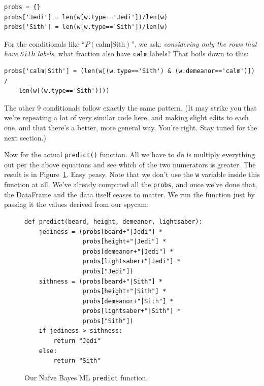 \begin{Verbatim}[fontsize=\small,samepage=true,frame=single]
probs = {}
probs['Jedi'] = len(w[w.type=='Jedi'])/len(w)
probs['Sith'] = len(w[w.type=='Sith'])/len(w)
\end{Verbatim}

For the conditionals like ``$P(\textrm{calm}|\textrm{Sith})$'', we ask:
\textit{considering only the rows that have \texttt{Sith} labels}, what
fraction also have \texttt{calm} labels? That boils down to this:

\footnotesize
\begin{Verbatim}[fontsize=\small,samepage=true,frame=single]
probs['calm|Sith'] = (len(w[(w.type=='Sith') & (w.demeanor=='calm')]) /
    len(w[(w.type=='Sith')]))
\end{Verbatim}
\normalsize

The other 9 conditionals follow exactly the same pattern. (It may strike you
that we're repeating a lot of very similar code here, and making slight edits
to each one, and that there's a better, more general way. You're right. Stay
tuned for the next section.)


Now for the actual \texttt{predict()} function. All we have to do is multiply
everything out per the above equations and see which of the two numerators is
greater. The result is in Figure~\ref{fig:predictFunc}. Easy peasy. Note that
we don't use the \texttt{w} variable inside this function at all. We've
already computed all the \texttt{probs}, and once we've done that, the
DataFrame and the data itself ceases to matter. We run the function just by
passing it the values derived from our spycam:

\begin{figure}
\begin{Verbatim}[fontsize=\small,samepage=true,frame=single]
def predict(beard, height, demeanor, lightsaber):
    jediness = (probs[beard+"|Jedi"] *
                probs[height+"|Jedi"] *
                probs[demeanor+"|Jedi"] *
                probs[lightsaber+"|Jedi"] *
                probs["Jedi"])
    sithness = (probs[beard+"|Sith"] *
                probs[height+"|Sith"] *
                probs[demeanor+"|Sith"] *
                probs[lightsaber+"|Sith"] *
                probs["Sith"])
    if jediness > sithness:
        return "Jedi"
    else:
        return "Sith"
\end{Verbatim}
\caption{Our Na\"{i}ve Bayes ML \texttt{predict} function.}
\label{fig:predictFunc}
\end{figure}

